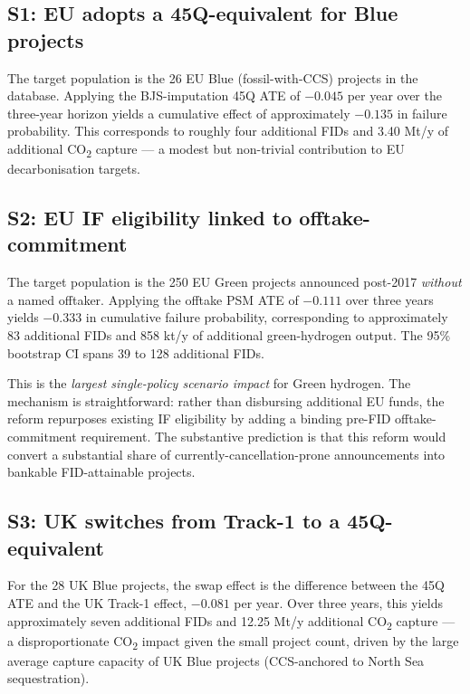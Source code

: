 \subsection{S1: EU adopts a 45Q-equivalent for Blue projects}

The target population is the 26 EU Blue (fossil-with-CCS) projects in the database. Applying the BJS-imputation 45Q ATE of $-0.045$ per year over the three-year horizon yields a cumulative effect of approximately $-0.135$ in failure probability. This corresponds to roughly four additional FIDs and 3.40 Mt/y of additional CO\textsubscript{2} capture --- a modest but non-trivial contribution to EU decarbonisation targets.

\subsection{S2: EU IF eligibility linked to offtake-commitment}

The target population is the 250 EU Green projects announced post-2017 \emph{without} a named offtaker. Applying the offtake PSM ATE of $-0.111$ over three years yields $-0.333$ in cumulative failure probability, corresponding to approximately 83 additional FIDs and 858 kt/y of additional green-hydrogen output. The 95\% bootstrap CI spans 39 to 128 additional FIDs.

This is the \emph{largest single-policy scenario impact} for Green hydrogen. The mechanism is straightforward: rather than disbursing additional EU funds, the reform repurposes existing IF eligibility by adding a binding pre-FID offtake-commitment requirement. The substantive prediction is that this reform would convert a substantial share of currently-cancellation-prone announcements into bankable FID-attainable projects.

\subsection{S3: UK switches from Track-1 to a 45Q-equivalent}

For the 28 UK Blue projects, the swap effect is the difference between the 45Q ATE and the UK Track-1 effect, $-0.081$ per year. Over three years, this yields approximately seven additional FIDs and 12.25 Mt/y additional CO\textsubscript{2} capture --- a disproportionate CO\textsubscript{2} impact given the small project count, driven by the large average capture capacity of UK Blue projects (CCS-anchored to North Sea sequestration).

